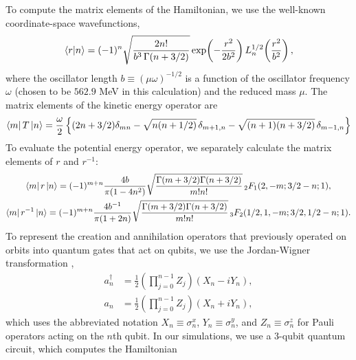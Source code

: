\documentclass[aps,10pt,superscriptaddress,floatfix,nofootinbib,notitlepage]{revtex4-1}
\begin{document}
To compute the matrix elements of the Hamiltonian, we use the well-known coordinate-space wavefunctions,
\begin{equation}
    \braket{r|n}
    =(-1)^n
    \sqrt{\frac{2n!}{b^3\,\Gamma(n+3/2)}}
    \exp\!\left(-\frac{r^2}{2b^2}\right)
    L_n^{1/2}
    \!\left(\frac{r^2}{b^2}\right),
\end{equation}
where the oscillator length $b\equiv(\mu\omega)^{-1/2}$ is a function of the oscillator frequency $\omega$ (chosen to be $562.9$ MeV in this calculation) and the reduced mass $\mu$. The matrix elements of the kinetic energy operator are
\begin{equation}
    \bra{m}T\ket{n}
    =\frac{\omega}{2}
    \left\{
    (2n+3/2)\delta_{mn}
    -\sqrt{n(n+1/2)}\,\delta_{m+1,n}
    -\sqrt{(n+1)(n+3/2)}\,\delta_{m-1,n}
    \right\}
\end{equation}
To evaluate the potential energy operator, we separately calculate the matrix elements of $r$ and $r^{-1}$:
\begin{gather}
\bra{m}r\ket{n}
=(-1)^{m+n}
\frac{4b}{\pi(1-4n^2)}
\sqrt{\frac{\Gamma(m+3/2)\Gamma(n+3/2)}{m!n!}}
\,{_2F_1}(2,-m;3/2-n;1),
\\
\bra{m}r^{-1}\ket{n}
=(-1)^{m+n}
\frac{4b^{-1}}{\pi(1+2n)}
\sqrt{\frac{\Gamma(m+3/2)\Gamma(n+3/2)}{m!n!}}
\,{_3F_2}(1/2,1,-m;3/2,1/2-n;1).
\end{gather}
To represent the creation and annihilation operators that previously operated on orbits into quantum gates that act on qubits, we use the Jordan-Wigner transformation \cite{JW_1928},
\begin{align}
    a_n^\dag
    &=\frac{1}{2}
    \left(
    \prod_{j=0}^{n-1}
    Z_j
    \right)
    (X_n-iY_n), \\
    a_n
    &=\frac{1}{2}
    \left(
    \prod_{j=0}^{n-1}
    Z_j
    \right)
    (X_n+iY_n),
\end{align} 
which uses the abbreviated notation $X_n\equiv\sigma_n^x$, $Y_n\equiv\sigma_n^y$, and $Z_n\equiv\sigma_n^z$ for Pauli operators acting on the $n$th qubit. In our simulations, we use a 3-qubit quantum circuit, which computes the Hamiltonian
\end{document}
